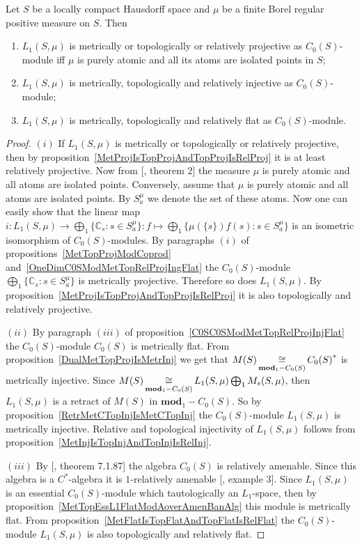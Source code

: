 \begin{proposition}\label{L1C0SModMetTopRelProjInjFlat} Let $S$ be a locally
compact Hausdorff space and $\mu$ be a finite Borel regular positive measure on
$S$. Then 

\begin{enumerate}[label = (\roman*)]
    \item $L_1(S,\mu)$ is metrically or topologically or relatively projective 
    as $C_0(S)$-module iff $\mu$ is purely atomic and all its atoms are 
    isolated points in $S$;

    \item $L_1(S,\mu)$ is metrically, topologically and relatively injective as
    $C_0(S)$-module;

    \item $L_1(S,\mu)$ is metrically, topologically and relatively flat as
    $C_0(S)$-module.
\end{enumerate}
\end{proposition}
\begin{proof} $(i)$ If $L_1(S,\mu)$ is metrically or topologically or relatively
projective, then by proposition~\ref{MetProjIsTopProjAndTopProjIsRelProj} it is
at least relatively projective. Now from [\cite{NemRelProjModLp}, theorem 2] 
the measure $\mu$ is purely atomic and all atoms are isolated  points.
Conversely, assume that $\mu$ is purely atomic and all atoms are isolated
points. By $S_a^{\mu}$ we denote the set of these atoms. Now one can easily show
that the linear map 
$i:L_1(S,\mu)\to\bigoplus_1 \{\mathbb{C}_s:s\in S_a^{\mu} \}
:f\mapsto \bigoplus_1 \{\mu( \{s \})f(s):s\in S_a^{\mu} \}$ is an isometric
isomorphism of $C_0(S)$-modules. By paragraphs $(i)$ of
propositions~\ref{MetTopProjModCoprod}
and~\ref{OneDimC0SModMetTopRelProjIngFlat} the $C_0(S)$-module $\bigoplus_1
\{\mathbb{C}_s:s\in S_a^{\mu} \}$ is metrically projective. Therefore so does
$L_1(S,\mu)$. By proposition~\ref{MetProjIsTopProjAndTopProjIsRelProj} it is
also topologically and relatively projective.

$(ii)$ By paragraph $(iii)$ of proposition~\ref{C0SC0SModMetTopRelProjInjFlat} 
the $C_0(S)$-module $C_0(S)$ is metrically flat. From
proposition~\ref{DualMetTopProjIsMetrInj} we get that
$M(S)\mathop{\mathbin{\cong}}\limits_{\mathbf{mod}_1-C_0(S)}{C_0(S)}^*$ is metrically injective. Since
$M(S)\mathop{\mathbin{\cong}}\limits_{\mathbf{mod}_1-C_0(S)}L_1(S,\mu)\bigoplus_1 M_s(S,\mu)$, then
$L_1(S,\mu)$ is a retract of $M(S)$ in $\mathbf{mod}_1-C_0(S)$. So by
proposition~\ref{RetrMetCTopInjIsMetCTopInj} the $C_0(S)$-module $L_1(S,\mu)$ is
metrically injective. Relative and topological injectivity of $L_1(S,\mu)$
follows from proposition~\ref{MetInjIsTopInjAndTopInjIsRelInj}.

$(iii)$ By [\cite{HelBanLocConvAlg}, theorem 7.1.87] the algebra $C_0(S)$ is
relatively amenable. Since this algebra is a $C^*$-algebra it is $1$-relatively 
amenable [\cite{RundeAmenConstFour}, example 3]. Since $L_1(S,\mu)$ is 
an essential $C_0(S)$-module which tautologically an $L_1$-space, then by
proposition~\ref{MetTopEssL1FlatModAoverAmenBanAlg} this module is metrically
flat. From proposition~\ref{MetFlatIsTopFlatAndTopFlatIsRelFlat} the
$C_0(S)$-module $L_1(S,\mu)$ is also topologically and relatively flat.
\end{proof}

